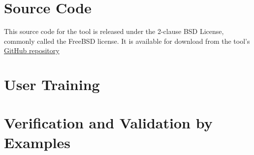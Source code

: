 \documentclass{simcenterdocumentation}
\begin{document}
\chapter{Source Code}
\label{chap:SourceCode}
This source code for the tool is released under the 2-clause BSD
License, commonly called the FreeBSD license.  It is available for
download from the
tool's \href{https://github.com/NHERI-SimCenter/s3hark}{GitHub
repository}

\chapter{User Training}
\label{chap:training}



\chapter{Verification and Validation by Examples}
\label{chap:vnv}




\nocite{*}


\pagestyle{plain}
{
  \renewcommand{\thispagestyle}[1]{}	
  \printbibliography           
}
\end{document}
